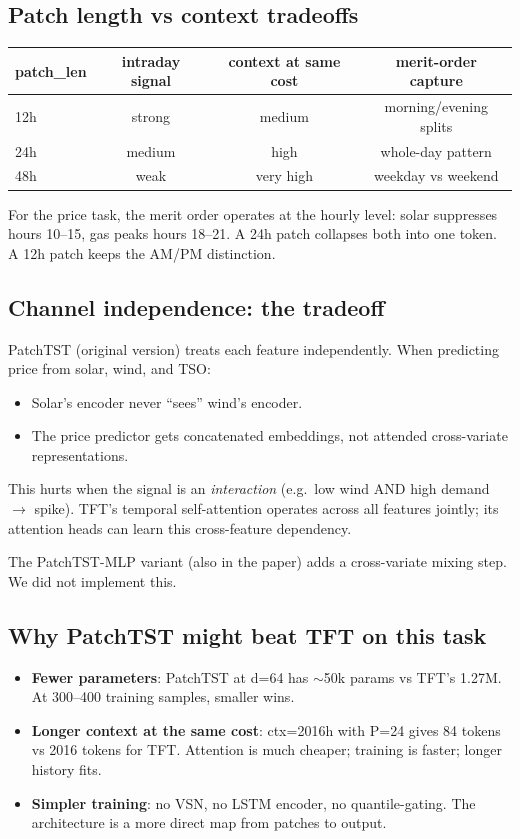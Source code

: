 \subsection{Patch length vs context tradeoffs}

\begin{center}
\begin{tabular}{lccc}
\toprule
patch\_len & intraday signal & context at same cost & merit-order capture \\
\midrule
12h & strong & medium & morning/evening splits \\
24h & medium & high & whole-day pattern \\
48h & weak & very high & weekday vs weekend \\
\bottomrule
\end{tabular}
\end{center}

For the price task, the merit order operates at the hourly level:
solar suppresses hours 10--15, gas peaks hours 18--21.
A 24h patch collapses both into one token.
A 12h patch keeps the AM/PM distinction.

\subsection{Channel independence: the tradeoff}

PatchTST (original version) treats each feature independently.
When predicting price from solar, wind, and TSO:
\begin{itemize}
  \item Solar's encoder never ``sees'' wind's encoder.
  \item The price predictor gets concatenated embeddings, not
        attended cross-variate representations.
\end{itemize}

This hurts when the signal is an \emph{interaction} (e.g.\ low wind
AND high demand $\to$ spike). TFT's temporal self-attention operates
across all features jointly; its attention heads can learn this
cross-feature dependency.

The PatchTST-MLP variant (also in the paper) adds a cross-variate
mixing step. We did not implement this.

\subsection{Why PatchTST might beat TFT on this task}

\begin{itemize}
  \item \textbf{Fewer parameters}: PatchTST at d=64 has $\sim$50k params
        vs TFT's 1.27M. At 300--400 training samples, smaller wins.
  \item \textbf{Longer context at the same cost}: ctx=2016h with
        P=24 gives 84 tokens vs 2016 tokens for TFT. Attention is
        much cheaper; training is faster; longer history fits.
  \item \textbf{Simpler training}: no VSN, no LSTM encoder, no
        quantile-gating. The architecture is a more direct map from
        patches to output.
\end{itemize}

